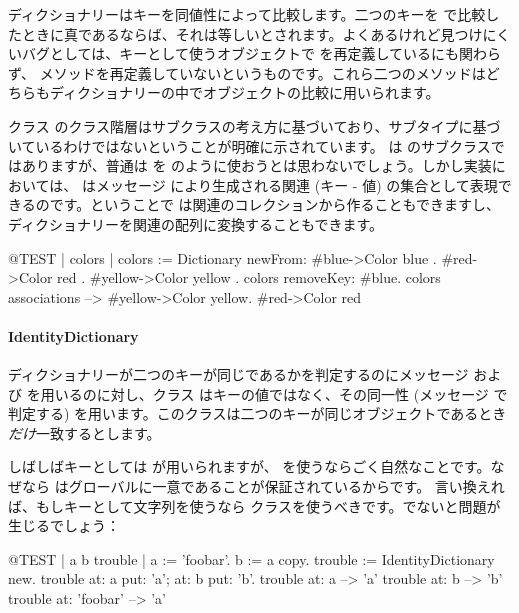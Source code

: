 \documentclass[a4paper,10pt,twoside]{book}
\begin{document}
ディクショナリーはキーを同値性によって比較します。二つのキーを \ct{=} で比較したときに真であるならば、それは等しいとされます。よくあるけれど見つけにくいバグとしては、キーとして使うオブジェクトで \ct{=} を再定義しているにも関わらず、 メソッドを再定義していないというものです。これら二つのメソッドはどちらもディクショナリーの中でオブジェクトの比較に用いられます。

クラス  のクラス階層はサブクラスの考え方に基づいており、サブタイプに基づいているわけではないということが明確に示されています。 は  のサブクラスではありますが、普通は  を  のように使おうとは思わないでしょう。しかし実装においては、 はメッセージ  により生成される関連 (キー - 値) の集合として表現できるのです。ということで  は関連のコレクションから作ることもできますし、ディクショナリーを関連の配列に変換することもできます。

\begin{code}{@TEST | colors |}
colors := Dictionary newFrom: { #blue->Color blue . #red->Color red . #yellow->Color yellow }.
colors removeKey: #blue.
colors associations --> {#yellow->Color yellow. #red->Color red}
\end{code}

\paragraph{IdentityDictionary}
ディクショナリーが二つのキーが同じであるかを判定するのにメッセージ \ct{=} および  を用いるのに対し、クラス  はキーの値ではなく、その同一性 (メッセージ  で判定する) を用います。\ie このクラスは二つのキーが同じオブジェクトであるとき\emph{だけ}一致するとします。

しばしばキーとしては  が用いられますが、 を使うならごく自然なことです。なぜなら  はグローバルに一意であることが保証されているからです。
言い換えれば、もしキーとして文字列を使うなら  クラスを使うべきです。でないと問題が生じるでしょう：

\begin{code}{@TEST | a b trouble |}
a := 'foobar'.
b := a copy.
trouble := IdentityDictionary new.
trouble at: a put: 'a'; at: b put: 'b'.
trouble at: a          --> 'a'
trouble at: b          --> 'b'
trouble at: 'foobar' --> 'a'
\end{code}
\end{document}
